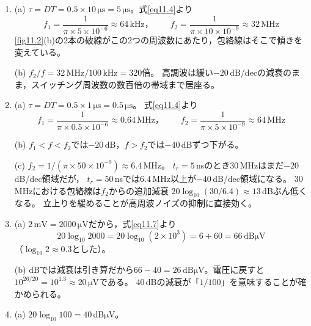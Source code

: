 \answer
\begin{enumerate}

\item[\ref{ex11.1}]
(a) $\tau = DT = 0.5 \times 10\,\mathrm{\mu s} = 5\,\mathrm{\mu s}$。式\ref{eq11.4}より
\begin{equation*}
f_1 = \frac{1}{\pi \times 5\times10^{-6}} \approx 64\,\mathrm{kHz}，\qquad
f_2 = \frac{1}{\pi \times 10\times10^{-9}} \approx 32\,\mathrm{MHz}
\end{equation*}
\ref{fig11.2}(b)の2本の破線がこの2つの周波数にあたり，包絡線はそこで傾きを変えている。

(b) $f_2/f = 32\,\mathrm{MHz}/100\,\mathrm{kHz} = 320$倍。
高調波は緩い$-20$\,dB/decの減衰のまま，スイッチング周波数の数百倍の帯域まで居座る。

\item[\ref{ex11.2}]
(a) $\tau = DT = 0.5 \times 1\,\mathrm{\mu s} = 0.5\,\mathrm{\mu s}$。
式\ref{eq11.4}より
\begin{equation*}
f_1 = \frac{1}{\pi \times 0.5\times10^{-6}} \approx 0.64\,\mathrm{MHz}，\qquad
f_2 = \frac{1}{\pi \times 5\times10^{-9}} \approx 64\,\mathrm{MHz}
\end{equation*}

(b) $f_1 < f < f_2$では$-20$\,dB，$f > f_2$では$-40$\,dBずつ下がる。

(c) $f_2 = 1/(\pi \times 50\times10^{-9}) \approx 6.4$\,MHz。
$t_r = 5$\,nsのとき$30$\,MHzはまだ$-20$\,dB/dec領域だが，
$t_r = 50$\,nsでは$6.4$\,MHz以上が$-40$\,dB/dec領域になる。
$30$\,MHzにおける包絡線は$f_2$からの追加減衰
$20\log_{10}(30/6.4) \approx 13$\,dBぶん低くなる。
立上りを緩めることが高周波ノイズの抑制に直接効く。

\item[\ref{ex11.3}]
(a) $2\,\mathrm{mV} = 2000\,\mathrm{\mu V}$だから，式\ref{eq11.7}より
\begin{equation*}
20 \log_{10} 2000 = 20 \log_{10} (2 \times 10^3) = 6 + 60 = 66\,\mathrm{dB\mu V}
\end{equation*}
（$\log_{10} 2 \approx 0.3$とした）。

(b) dBでは減衰は引き算だから$66 - 40 = 26\,\mathrm{dB\mu V}$。電圧に戻すと
$10^{26/20} = 10^{1.3} \approx 20\,\mathrm{\mu V}$である。
$40$\,dBの減衰が「$1/100$」を意味することが確かめられる。

\item[\ref{ex11.4}]
(a) $20\log_{10} 100 = 40$\,dB$\mathrm{\mu}$V。


\end{enumerate}
